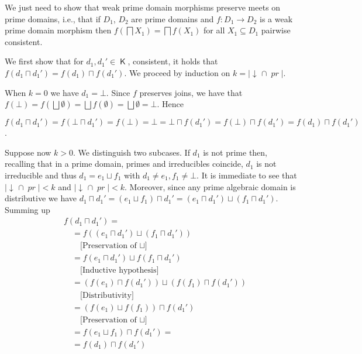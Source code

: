 \documentclass[conference]{IEEEtran}
\renewenvironment{proof}{\begin{IEEEproof}}{\end{IEEEproof}}
\newcommand{\compact}[1]{\ensuremath{\mathop{\mathsf{K}({#1})}}}
\newcommand{\principal}[1]{\ensuremath{\mathop{\downarrow\!{#1}}}}
\newcommand{\pr}[1]{\ensuremath{\mathop{\mathit{pr}({#1})}}}
\begin{document}
\begin{proof}
  We just need to show that weak prime domain morphisms preserve meets
  on prime domains, i.e., that if $D_1$, $D_2$ are prime domains and
  $f : D_1 \to D_2$ is a weak prime domain morphism then
  $f(\bigsqcap X_1) = \bigsqcap f(X_1)$ for all $X_1 \subseteq D_1$
  pairwise consistent.
  
  We first show that for $d_1, d_1' \in \compact{D_1}$, consistent, it
  holds that $f(d_1 \sqcap d_1') = f(d_1) \sqcap f(d_1')$. We proceed
  by induction on $k = |\principal{d_1} \cap \pr{D}|$.

  When $k=0$ we have $d_1 = \bot$. Since $f$ preserves joins, we have
  that
  $f(\bot) = f(\bigsqcup \emptyset) = \bigsqcup f(\emptyset) =
  \bigsqcup \emptyset = \bot$.  Hence
  \begin{center}
    $f(d_1 \sqcap d_1') = f(\bot \sqcap d_1') = f(\bot)= \bot = \bot \sqcap
    f(d_1') = f(\bot) \sqcap f(d_1') = f(d_1) \sqcap f(d_1')$.
  \end{center}
  
  Suppose now $k > 0$. We distinguish two subcases. If $d_1$ is not
  prime then, recalling that in a prime domain, primes and
  irreducibles coincide, $d_1$ is not irreducible and thus
  $d_1 = e_1 \sqcup f_1$ with $d_1 \neq e_1, f_1 \neq \bot$. It is
  immediate to see that $|\principal{e_1} \cap \pr{D}| < k$ and
  $|\principal{f_1} \cap \pr{D}| < k$. Moreover, since any prime
  algebraic domain is distributive we have
  $d_1 \sqcap d_1' = (e_1 \sqcup f_1) \sqcap d_1' = (e_1 \sqcap d_1')
  \sqcup (f_1 \sqcap d_1')$. Summing up
  \begin{align*}
    & f(d_1 \sqcap d_1') = \\[1mm]
    & \quad =f((e_1 \sqcap d_1') \sqcup (f_1 \sqcap d_1'))\\
    & \qquad \mbox{[Preservation of $\sqcup$]}\\[1mm]
    & \quad =f(e_1 \sqcap d_1') \sqcup f(f_1 \sqcap d_1')\\
    & \qquad \mbox{[Inductive hypothesis]}\\[1mm]
    & \quad =(f(e_1) \sqcap f(d_1')) \sqcup (f(f_1) \sqcap f(d_1'))\\
    & \qquad \mbox{[Distributivity]}\\[1mm]
    & \quad =(f(e_1) \sqcup f(f_1)) \sqcap f(d_1')\\
    & \qquad \mbox{[Preservation of $\sqcup$]}\\[1mm]
    & \quad =f(e_1 \sqcup f_1) \sqcap f(d_1') =\\[1mm]
    & \quad =f(d_1) \sqcap f(d_1')
  \end{align*}


\end{proof}
\end{document}
